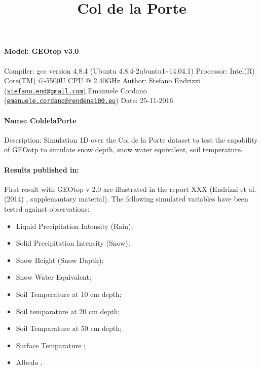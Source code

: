 \documentclass[
]{article}
\title{Col de la Porte}
\author{}
\date{\vspace{-2.5em}}
\begin{document}
\maketitle

\hypertarget{model-geotop-v3.0}{%
\paragraph{Model: GEOtop v3.0}\label{model-geotop-v3.0}}

Compiler: gcc version 4.8.4 (Ubuntu
4.8.4-2ubuntu1\textasciitilde14.04.1) Processor: Intel(R) Core(TM)
i7-5500U CPU @ 2.40GHz Author: Stefano Endrizzi
(\href{mailto:stefano.end@gmail.com}{\nolinkurl{stefano.end@gmail.com}}),Emanuele
Cordano
(\href{mailto:emanuele.cordano@rendena100.eu}{\nolinkurl{emanuele.cordano@rendena100.eu}})
Date: 25-11-2016

\hypertarget{name-coldelaporte}{%
\paragraph{Name: ColdelaPorte}\label{name-coldelaporte}}

Description: Simulation 1D over the Col de la Porte dataset to test the
capability of GEOotp to simulate snow depth, snow water equivalent, soil
temperature.

\hypertarget{results-published-in}{%
\paragraph{Results published in:}\label{results-published-in}}

First result with GEOtop v 2.0 are illustrated in the report XXX
(Endrizzi et al. (2014) , supplemantary material). The following
simulated variables have been tested against observations:

\begin{itemize}
\item
  Liquid Precipitation Intensity (Rain);
\item
  Solid Precipitation Intensity (Snow);
\item
  Snow Height (Snow Dapth);
\item
  Snow Water Equivalent;
\item
  Soil Temperature at 10 cm depth;
\item
  Soil temparature at 20 cm depth;
\item
  Soil Temparature at 50 cm depth;
\item
  Surface Temparature ;
\item
  Albedo .
\end{itemize}
\end{document}
